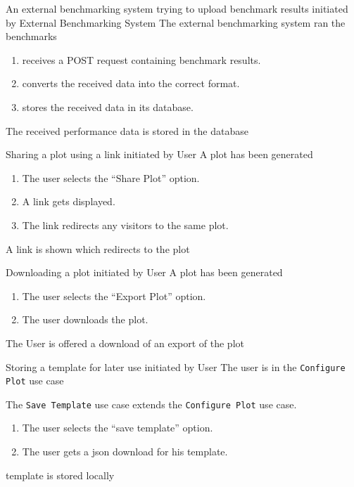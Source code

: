 \bigskip

{An external \gls{benchmarking system} trying to upload \glspl{benchmark result}}
{initiated by External Benchmarking System}
{The external \gls{benchmarking system} ran the benchmarks}
{\begin{enumerate}
    \item \parkview{} receives a POST request containing \glspl{benchmark result}.
    \item \parkview{} converts the received data into the correct format.
    \item \parkview{} stores the received data in its database.
\end{enumerate}}
{The received performance data is stored in the database}

\bigskip

{Sharing a \gls{plot} using a link}
{initiated by User}
{A \gls{plot} has been generated}
{\begin{enumerate}
    \item The user selects the \enquote{Share Plot} option.
    \item A link gets displayed.
    \item The link redirects any visitors to the same \gls{plot}.
\end{enumerate}}
{A link is shown which redirects to the \gls{plot}}

\bigskip

{Downloading a \gls{plot}}
{initiated by User}
{A \gls{plot} has been generated}
{\begin{enumerate}
    \item The user selects the \enquote{Export Plot} option.
    \item The user downloads the \gls{plot}.
\end{enumerate}}
{The User is offered a download of an export of the \gls{plot}}

\bigskip

{Storing a \gls{template} for later use}
{initiated by User}
{The user is in the \texttt{Configure Plot} use case}
{The \texttt{Save Template} use case extends the \texttt{Configure Plot} use case.
\begin{enumerate}
    \item The user selects the \enquote{save template} option.
    \item The user gets a \gls{json} download for his \gls{template}.
\end{enumerate}}
{\Gls{template} is stored locally}

